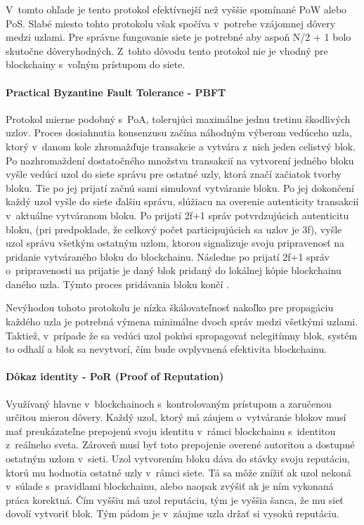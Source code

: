 V~tomto ohľade je tento protokol efektívnejší než vyššie spomínané PoW alebo PoS. Slabé miesto tohto protokolu však spočíva v~potrebe vzájomnej dôvery medzi uzlami. Pre správne fungovanie siete je potrebné aby aspoň N/2 + 1 bolo skutočne dôveryhodných. Z~tohto dôvodu tento protokol nie je vhodný pre blockchainy s~voľným prístupom do siete.

\paragraph{Practical Byzantine Fault Tolerance - PBFT}

Protokol mierne podobný s~PoA, tolerujúci maximálne jednu tretinu škodlivých uzlov. Proces dosiahnutia konsenzusu začína náhodným výberom vedúceho uzla, ktorý v~danom kole zhromažďuje transakcie a vytvára z~nich jeden celistvý blok. Po nazhromaždení dostatočného množstva transakcií na vytvorení jedného bloku vyšle vedúci uzol do siete správu pre ostatné uzly, ktorá značí začiatok tvorby bloku. Tie po jej prijatí začnú sami simulovať vytváranie bloku. Po jej dokončení každý uzol vyšle do siete ďalšiu správu, slúžiacu na overenie autenticity transakcií v~aktuálne vytváranom bloku. Po prijatí 2f+1 správ potvrdzujúcich autenticitu bloku, (pri predpoklade, že celkový počet participujúcich sa uzlov je 3f), vyšle uzol správu všetkým ostatným uzlom, ktorou signalizuje svoju pripravenosť na pridanie vytváraného bloku do blockchainu. Následne po prijatí 2f+1 správ o~pripravenosti na prijatie je daný blok pridaný do lokálnej kópie blockchainu daného uzla. Týmto proces pridávania bloku končí \cite{pbft}.

Nevýhodou tohoto protokolu je nízka škálovateľnosť nakoľko pre propagáciu každého uzla je potrebná výmena minimálne dvoch správ medzi všetkými uzlami. Taktiež, v~prípade že sa vedúci uzol pokúsi spropagovať nelegitímny blok, systém to odhalí a blok sa nevytvorí, čím bude ovplyvnená efektivita blockchainu.


\paragraph{Dôkaz identity - PoR (Proof of Reputation)}

Využívaný hlavne v~blockchainoch s~kontrolovaným prístupom a zaručenou určitou mierou dôvery. Každý uzol, ktorý má záujem o~vytváranie blokov musí mať preukázateľne prepojenú svoju identitu v~rámci blockchainu s~identitou z~reálneho sveta. Zároveň musí byť toto prepojenie overené autoritou a dostupné ostatným uzlom v~sieti. Uzol vytvorením bloku dáva do stávky svoju reputáciu, ktorú mu hodnotia ostatné uzly v~rámci siete. Tá sa môže znížiť ak uzol nekoná v~súlade s~pravidlami blockchainu, alebo naopak zvýšiť ak je ním vykonaná práca korektná. Čím vyššiu má uzol reputáciu, tým je vyššia šanca, že mu sieť dovolí vytvoriť blok. Tým pádom je v~záujme uzla držať si vysokú reputáciu.

